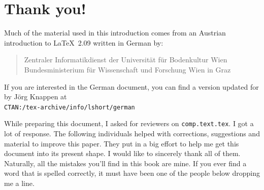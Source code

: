 \chapter*{Thank you!}
\noindent Much of the material used in this introduction comes from an
Austrian introduction to \LaTeX\ 2.09 written in German by:
\begin{verse}
%
{Zentraler Informatikdienst der Universit\"at f\"ur Bodenkultur Wien}
%
   {Bundesministerium f\"ur Wissenschaft und Forschung Wien}
%
   {in Graz}
\end{verse}

If you are interested in the German document, you can find a version
updated for \LaTeXe{} by J\"org Knappen at\\
\texttt{CTAN:/tex-archive/info/lshort/german}

\newpage
\noindent While preparing this document, I asked
for reviewers on \texttt{comp.text.tex}. I got a lot of response. The
following individuals helped with corrections, suggestions and
material to improve this paper. They put in a big effort to help me
get this document into its present shape. I would like to
sincerely thank all of them. Naturally, all the mistakes you'll find
in this book are mine. If you ever find a word that is spelled
correctly, it must have been one of the people below dropping me a
line.

